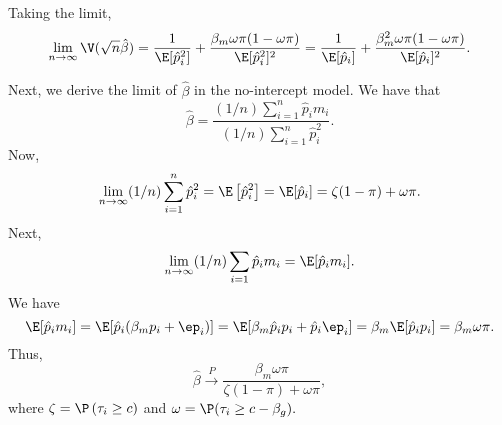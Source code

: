 \documentclass[12pt]{article}
\begin{document}
Taking the limit,
$$ \lim_{n \to \infty} \V(\sqrt{n} \hat{\beta}) = \frac{1}{\E[ \hat{p}_i^2]} + \frac{ \beta_m \omega \pi (1 - \omega \pi) }{ \E[\hat{p}_i^2]^2} = \frac{1}{\E[ \hat{p}_i]} + \frac{\beta_m^2 \omega \pi (1 - \omega \pi)}{\E[\hat{p}_i]^2}.$$

Next, we derive the limit of $\hat{\beta}$ in the no-intercept model. We have that 
$$\hat{\beta} = \frac{ (1/n) \sum_{i=1}^n \hat{p}_i m_i}{(1/n) \sum_{i=1}^n \hat{p}_i^2}.$$
Now,
$$\lim_{n \to \infty} (1/n) \sum_{i=1}^n \hat{p}_i^2 = \E\left[\hat{p}_i^2\right] = \E [\hat{p}_i] = \zeta (1 - \pi) + \omega \pi.$$
Next,
$$\lim_{n \to \infty} (1/n) \sum_{i=1} \hat{p}_i m_i = \E[\hat{p}_i m_i].$$ We have
$$ \E[\hat{p}_i m_i] = \E[ \hat{p}_i (\beta_m p_i + \ep_i)] = \E[\beta_m \hat{p}_i p_i + \hat{p}_i \ep_i] = \beta_m \E[ \hat{p}_i p_i] = \beta_m \omega \pi.$$ Thus,
$$ \hat{\beta} \xrightarrow{P} \frac{\beta_m \omega \pi}{ \zeta(1-\pi) + \omega \pi},$$ where $\zeta = \P\left(\tau_i \geq c \right)$ and $\omega = \P(\tau_i \geq c - \beta_g).$
\end{document}
